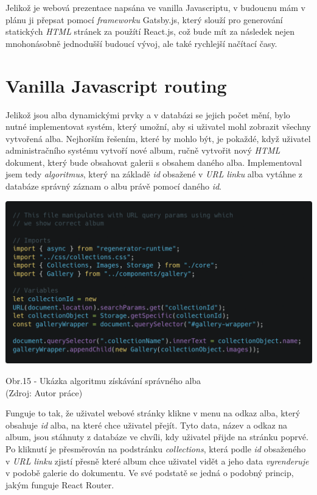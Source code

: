 \documentclass[12pt,a4paper]{report}
\begin{document}
  Jelikož je webová prezentace napsána ve vanilla Javascriptu, v budoucnu mám v plánu ji přepsat
  pomocí \emph{frameworku} Gatsby.js, který slouží pro generování statických \emph{HTML} stránek za použítí
  React.js, což bude mít za následek nejen mnohonásobně jednodušší budoucí vývoj, ale také
  rychlejší načítací časy.

  \section{Vanilla Javascript routing}
  Jelikož jsou alba dynamickými prvky a v databázi se jejich počet mění, bylo nutné implementovat systém, který
  umožní, aby si uživatel mohl zobrazit všechny vytvořená alba. Nejhorším řešením, které by mohlo být,
  je pokaždé, když uživatel administračního systému vytvoří nové album, ručně vytvořit nový \emph{HTML} dokument, který bude 
  obsahovat galerii s obsahem daného alba. Implementoval jsem tedy \emph{algoritmus}, který na základě \emph{id} obsažené v \emph{URL linku} alba vytáhne z
  databáze správný záznam o albu právě pomocí daného \emph{id}.

  \vspace*{0.5cm}
  \noindent\includegraphics[width=\linewidth]{vanillaJsRoutingCodeblock.png}
  \begin{center}
    Obr.15 -   Ukázka algoritmu získávání správného alba \\
    (Zdroj: Autor práce)
  \end{center}
  \vspace*{0.5cm}

  Funguje to tak, že uživatel webové stránky klikne v menu na odkaz alba, který obsahuje \emph{id} alba, na které chce uživatel přejít.
  Tyto data, název a odkaz na album, jsou stáhnuty z databáze ve chvíli, kdy uživatel přijde na stránku poprvé.
  Po kliknutí je přesměrován na podstránku \emph{collections}, která podle \emph{id} obsaženého v \emph{URL linku}
  zjistí přesně které album chce uživatel vidět a jeho data \emph{vyrenderuje} v podobě galerie do dokumentu.
  Ve své podstatě se jedná o podobný princip, jakým funguje React Router.
\end{document}
